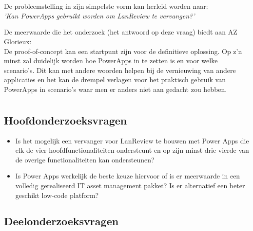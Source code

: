 \section{}
\label{sec:probleemstelling}

De probleemstelling in zijn simpelste vorm kan herleid worden naar:\\
\textit{'Kan PowerApps gebruikt worden om LanReview te vervangen?'}

De meerwaarde die het onderzoek (het antwoord op deze vraag) biedt aan AZ Glorieux:\\
De proof-of-concept kan een startpunt zijn voor de definitieve oplossing. Op z'n minst zal duidelijk worden hoe PowerApps in te zetten is en voor welke scenario's. Dit kan met andere woorden helpen bij de vernieuwing van andere applicaties en het kan de drempel verlagen voor het praktisch gebruik van PowerApps in scenario's waar men er anders niet aan gedacht zou hebben.

\section{}
\label{sec:onderzoeksvraag}

\subsection{Hoofdonderzoeksvragen}

\begin{itemize}
    \item Is het mogelijk een vervanger voor LanReview te bouwen met Power Apps die elk de vier hoofdfunctionaliteiten ondersteunt en op zijn minst drie vierde van de overige functionaliteiten kan ondersteunen?
    \item Is Power Apps werkelijk de beste keuze hiervoor of is er meerwaarde in een volledig gerealiseerd IT asset management pakket? Is er alternatief een beter geschikt low-code platform?
\end{itemize}

\subsection{Deelonderzoeksvragen}

